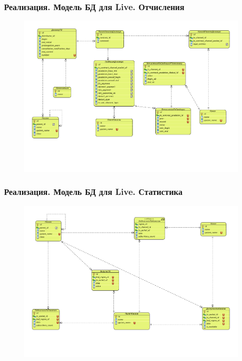 \documentclass{beamer}
\begin{document}
\begin{frame}[t]
\frametitle{Реализация. Модель БД для Live. Отчисления}
\begin{figure}
\begin{center}
\vspace{-1cm}
\hspace*{-1cm} \includegraphics[scale=0.43]{../resources/uml/TV_DEDUCT.pdf}
\end{center}
\end{figure}
\end{frame}

\begin{frame}[t]
\frametitle{Реализация. Модель БД для Live. Статистика}
\begin{figure}
\begin{center}
\vspace{-1cm}
\hspace*{-1cm} \includegraphics[scale=0.43]{../resources/uml/TV_STAT.pdf}
\end{center}
\end{figure}
\end{frame}
\end{document}
